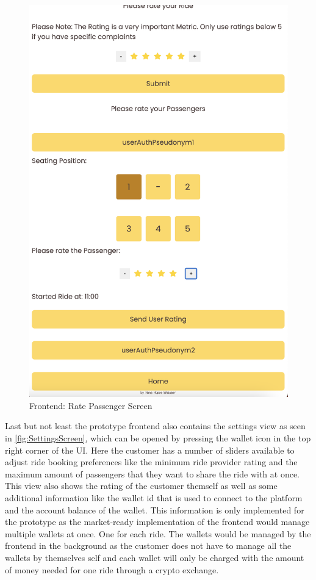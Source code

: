 \begin{figure}[H]
\begin{minipage}{0.45\linewidth}
        \includegraphics[width=\linewidth]{data/ffss/12.png}
        \caption{Frontend: Rate Passenger Screen}
        \label{fig:RatePassengerScreen}
    \end{minipage}
    
\end{figure}

Last but not least the prototype frontend  also contains the settings view as seen in \ref{fig:SettingsScreen}, which can be opened by pressing the wallet icon in the top right corner of the UI. Here the customer has a number of sliders available to adjust ride booking preferences like the minimum ride provider rating and the maximum amount of passengers that they want to share the ride with at once. This view also shows the rating of the customer themself as well as some additional information like the wallet id that is used to connect to the platform and the account balance of the wallet. This information is only implemented for the prototype as the market-ready implementation of the frontend would manage multiple wallets at once. One for each ride. The wallets would be managed by the frontend in the background as the customer does not have to manage all the wallets by themselves self and each wallet will only be charged with the amount of money needed for one ride through a crypto exchange.

